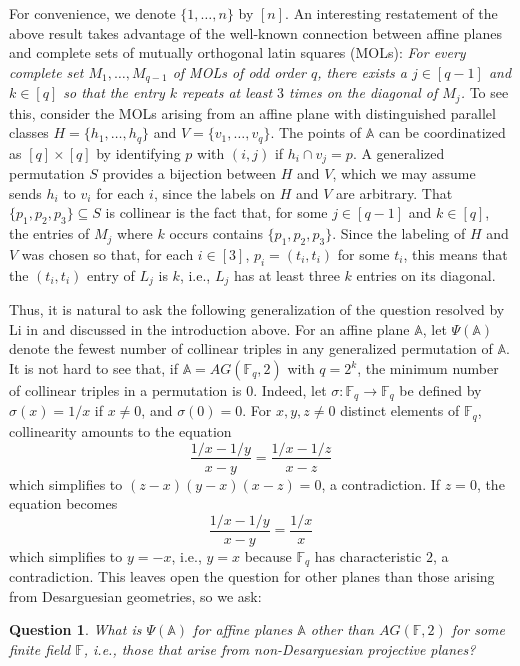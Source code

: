 \documentclass[12pt]{article}
\newcommand{\F}{\mathbb{F}}
\newtheorem{question}{Question}
\begin{document}
For convenience, we denote $\{1,\ldots,n\}$ by $[n]$.  An interesting restatement of the above result takes advantage of the well-known connection between affine planes and complete sets of mutually orthogonal latin squares (MOLs): {\em For every complete set $M_1,\ldots,M_{q-1}$ of MOLs of odd order $q$, there exists a $j \in [q-1]$ and $k \in [q]$ so that the entry $k$ repeats at least $3$ times on the diagonal of $M_j$.}  To see this, consider the MOLs arising from an affine plane with distinguished parallel classes $H = \{h_1,\ldots,h_q\}$ and $V = \{v_1,\ldots,v_q\}$.  The points of $\mathbb{A}$ can be coordinatized as $[q] \times [q]$ by identifying $p$ with $(i,j)$ if $h_i \cap v_j = p$.  A generalized permutation $S$ provides a bijection between $H$ and $V$, which we may assume sends $h_i$ to $v_i$ for each $i$, since the labels on $H$ and $V$ are arbitrary.  That $\{p_1,p_2,p_3\} \subseteq S$ is collinear is the fact that, for some $j \in [q-1]$ and $k \in [q]$, the entries of $M_j$ where $k$ occurs contains $\{p_1,p_2,p_3\}$.  Since the labeling of $H$ and $V$ was chosen so that, for each $i \in [3]$, $p_i = (t_i,t_i)$ for some $t_i$, this means that the $(t_i,t_i)$ entry of $L_j$ is $k$, i.e., $L_j$ has at least three $k$ entries on its diagonal.

Thus, it is natural to ask the following generalization of the question resolved by Li in \cite{li} and discussed in the introduction above.  For an affine plane $\mathbb{A}$, let $\Psi(\mathbb{A})$ denote the fewest number of collinear triples in any generalized permutation of $\mathbb{A}$.  It is not hard to see that, if $\mathbb{A} = AG(\F_q,2)$ with $q = 2^k$, the minimum number of collinear triples in a permutation is $0$.  Indeed, let $\sigma : \F_q \rightarrow \F_q$ be defined by $\sigma(x)=1/x$ if $x \neq 0$, and $\sigma(0)=0$.  For $x,y,z \neq 0$ distinct elements of $\F_q$, collinearity amounts to the equation
$$
\frac{1/x-1/y}{x-y} = \frac{1/x-1/z}{x-z}
$$
which simplifies to $(z-x)(y-x)(x-z)=0$, a contradiction.  If $z=0$, the equation becomes
$$
\frac{1/x-1/y}{x-y} = \frac{1/x}{x}
$$
which simplifies to $y=-x$, i.e., $y=x$ because $\F_q$ has characteristic $2$, a contradiction.  This leaves open the question for other planes than those arising from Desarguesian geometries, so we ask:

\begin{question}
    What is $\Psi(\mathbb{A})$ for affine planes $\mathbb{A}$ other than $AG(\F,2)$ for some finite field $\F$, i.e., those that arise from non-Desarguesian projective planes?
\end{question}
\end{document}
